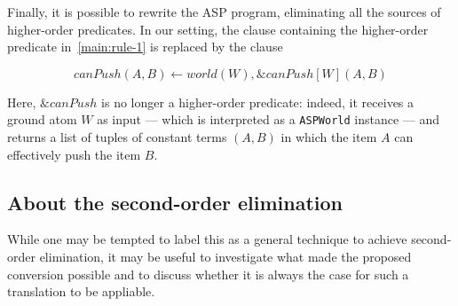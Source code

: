 Finally, it is possible to rewrite the ASP program, eliminating all the sources of higher-order predicates.
In our setting, the clause containing the higher-order predicate in~\eqref{main:rule-1} is replaced by the clause

$$ canPush(A,B) \leftarrow world(W), \&canPush[W](A,B) \label{main:rule-3} $$

Here, $\&canPush$ is no longer a higher-order predicate: indeed, it receives a ground atom $W$ as input --- which is interpreted as a \texttt{ASPWorld} instance --- and returns a list of tuples of constant terms $(A,B)$ in which the item $A$ can effectively push the item $B$.

\subsection{About the second-order elimination}

While one may be tempted to label this as a general technique to achieve second-order elimination, it may be useful to investigate what made the proposed conversion possible and to discuss whether it is always the case for such a translation to be appliable.


